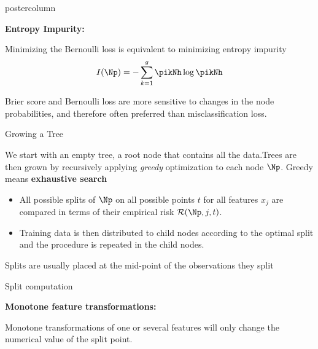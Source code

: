 \documentclass{beamer}
\begin{document}
\begin{frame}[fragile]{}
\begin{columns}
\begin{column}{.31\textwidth}
\begin{beamercolorbox}[center]{postercolumn}
\begin{minipage}{.98\textwidth}
{\begin{myblock}{ }
    \begin{codebox}
  \textbf{Entropy Impurity:}
  \end{codebox}
  Minimizing the Bernoulli loss is equivalent to minimizing entropy impurity $$I(\Np) = -\sum_{k=1}^g \pikNh \log \pikNh$$
    
    Brier score and Bernoulli loss are more sensitive to changes in the node probabilities, and therefore often preferred than misclassification loss.
  
  \end{myblock}
  \begin{myblock}{Growing a Tree}
  
  We start with an empty tree, a root node that contains all the data.\vspace*{1ex}Trees are then grown by recursively applying \emph{greedy} optimization to each node $\Np$. Greedy means \textbf{exhaustive search}\vspace*{1ex}
  
  \begin{itemize}[$\bullet$]     
  \setlength{\itemindent}{+.3in}
  \item All possible splits of $\Np$ on all possible points $t$ for all features $x_j$ are compared in terms of their empirical risk $\risk(\Np, j, t)$.
  \item Training data is then distributed to child nodes according to the optimal split and the procedure is repeated in the child nodes.      \end{itemize}
  
  Splits are usually placed at the mid-point of the observations they split
  \end{myblock}
  
  \begin{myblock}{Split computation}
  
  \begin{codebox}
  \textbf{Monotone feature transformations: }	\end{codebox}
  Monotone transformations of one or several features will only change the numerical value of the split point.\vspace*{1ex}
  \end{myblock}
}
\end{minipage}
\end{beamercolorbox}
\end{column}



\end{columns}
\end{frame}
\end{document}
